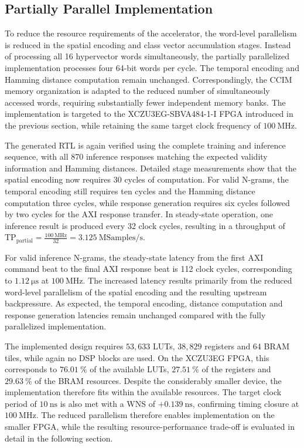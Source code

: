 \subsection{Partially Parallel Implementation}
\label{sec:partParallelResults}

To reduce the resource requirements of the accelerator, the word-level parallelism is reduced in the spatial encoding and class vector accumulation stages. Instead of processing all 16 hypervector words simultaneously, the partially parallelized implementation processes four 64-bit words per cycle. The temporal encoding and Hamming distance computation remain unchanged. Correspondingly, the CCIM memory organization is adapted to the reduced number of simultaneously accessed words, requiring substantially fewer independent memory banks. The implementation is targeted to the XCZU3EG-SBVA484-1-I FPGA introduced in the previous section, while retaining the same target clock frequency of $100~\mathrm{MHz}$.

The generated RTL is again verified using the complete training and inference sequence, with all 870 inference responses matching the expected validity information and Hamming distances. Detailed stage measurements show that the spatial encoding now requires 30 cycles of computation. For valid N-grams, the temporal encoding still requires ten cycles and the Hamming distance computation three cycles, while response generation requires six cycles followed by two cycles for the AXI response transfer. In steady-state operation, one inference result is produced every 32 clock cycles, resulting in a throughput of $\mathrm{TP}_{\mathrm{partial}}=\frac{100~\mathrm{MHz}}{32}=3.125~\mathrm{MSamples/s}.$

For valid inference N-grams, the steady-state latency from the first AXI command beat to the final AXI response beat is 112 clock cycles, corresponding to $1.12~\mathrm{\mu s}$ at $100~\mathrm{MHz}$. The increased latency results primarily from the reduced word-level parallelism of the spatial encoding and the resulting upstream backpressure. As expected, the temporal encoding, distance computation and response generation latencies remain unchanged compared with the fully parallelized implementation.

The implemented design requires $53{,}633$ \acp{LUT}, $38{,}829$ registers and 64 \ac{BRAM} tiles, while again no DSP blocks are used. On the XCZU3EG FPGA, this corresponds to $76.01~\%$ of the available \acp{LUT}, $27.51~\%$ of the registers and $29.63~\%$ of the \ac{BRAM} resources. Despite the considerably smaller device, the implementation therefore fits within the available resources. The target clock period of $10~\mathrm{ns}$ is also met with a WNS of $+0.139~\mathrm{ns}$, confirming timing closure at $100~\mathrm{MHz}$. The reduced parallelism therefore enables implementation on the smaller FPGA, while the resulting resource-performance trade-off is evaluated in detail in the following section.


